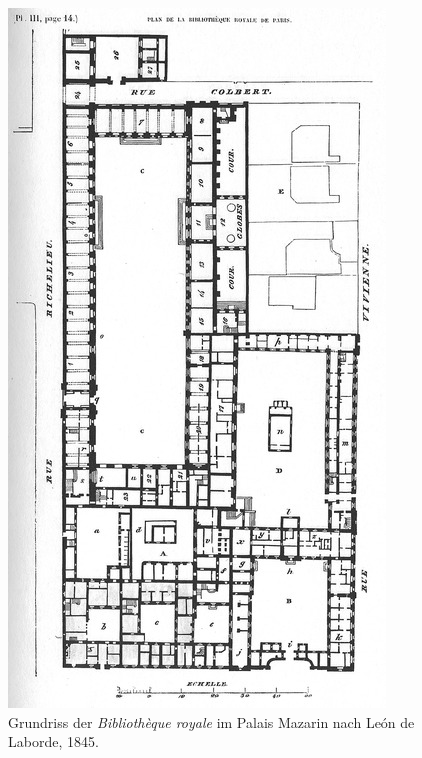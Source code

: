 \begin{figure}[htbp]
\centering
\includegraphics{img/wagner-4.jpg}
\caption{Grundriss der \emph{Bibliothèque royale} im Palais
Mazarin nach León de Laborde, 1845.}
\end{figure}


